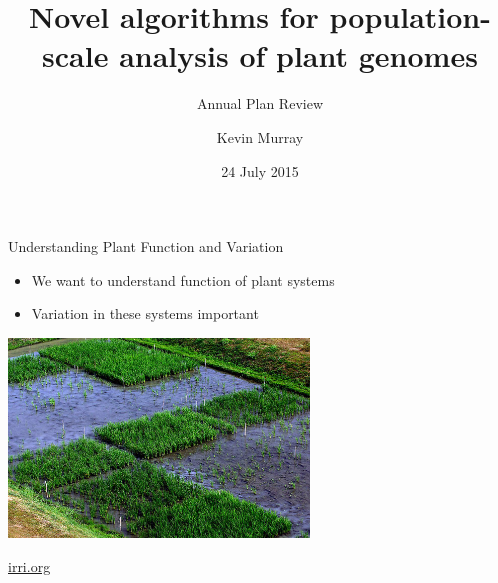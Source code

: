 \documentclass[t]{beamer}
\title{Novel algorithms for population-scale analysis of plant genomes}
\subtitle{\small{Annual Plan Review}}
\author{Kevin Murray}
\institute{Borevitz Lab, CPEB, ANU}
\date{24 July 2015}
\begin{document}
{
\begin{frame}
  \titlepage
  \vfill
\end{frame}
}


\begin{frame}{Understanding Plant Function and Variation}
  \begin{itemize}
    \item We want to understand function of plant systems
    \item Variation in these systems important
  \end{itemize}
  \begin{center}
    \includegraphics[width=0.6\textwidth]{img/rice-paddy.jpg}
  \end{center}
  \tiny{\url{irri.org}}
\end{frame}
\end{document}
